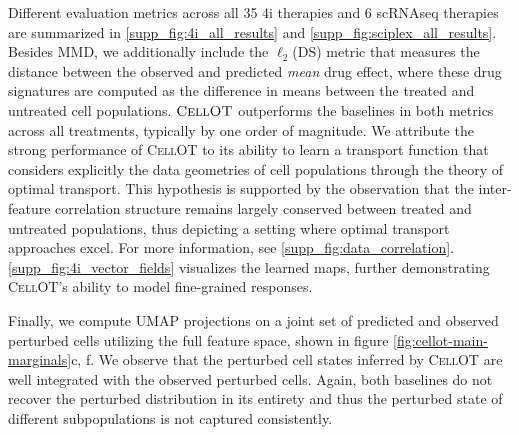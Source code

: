 Different evaluation metrics across all 35 4i therapies and 6 scRNAseq therapies are summarized in \ref{supp_fig:4i_all_results} and \ref{supp_fig:sciplex_all_results}.
Besides MMD, we additionally include the $\ell_2$(DS) metric that measures the distance between the observed and predicted \emph{mean} drug effect, where these drug signatures are computed as the difference in means between the treated and untreated cell populations.
$\textsc{CellOT}$ outperforms the baselines in both metrics across all treatments, typically by one order of magnitude.
We attribute the strong performance of \textsc{CellOT} to its ability to learn a transport function that considers explicitly the data geometries of cell populations through the theory of optimal transport.
This hypothesis is supported by the observation that the inter-feature correlation structure remains largely conserved between treated and untreated populations, thus depicting a setting where optimal transport approaches excel. For more information, see \ref{supp_fig:data_correlation}.
\ref{supp_fig:4i_vector_fields} visualizes the learned maps, %
further demonstrating \textsc{CellOT}'s ability to model fine-grained responses. %

Finally, we compute UMAP projections \cite{umap} on a joint set of predicted and observed perturbed cells utilizing the full feature space, shown in figure \ref{fig:cellot-main-marginals}c, f.
We observe that the perturbed cell states inferred by \textsc{CellOT} are well integrated with the observed perturbed cells. Again, both baselines do not recover the perturbed distribution in its entirety %
and thus the perturbed state of different subpopulations is not captured consistently.


